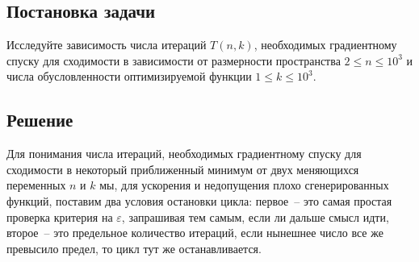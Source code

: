 \documentclass[12pt, a4paper, oneside, final]{article}
\begin{document}
	\subsection*{Постановка задачи}
	Исследуйте зависимость числа итераций $T(n, k)$, необходимых градиентному спуску для сходимости в зависимости от размерности пространства $2 \leqslant n \leqslant 10^{3}$ и числа обусловленности оптимизируемой функции $1 \leqslant k \leqslant 10^{3}$.
	\subsection*{Решение}
	Для понимания числа итераций, необходимых градиентному спуску для сходимости в некоторый приближенный минимум от двух меняющихся переменных $n$ и $k$ мы, для ускорения и недопущения плохо сгенерированных функций, поставим два условия остановки цикла: первое~-- это самая простая проверка критерия на $\varepsilon$, запрашивая тем самым, если ли дальше смысл идти, второе~-- это предельное количество итераций, если нынешнее число все же превысило предел, то цикл тут же останавливается.
\end{document}
